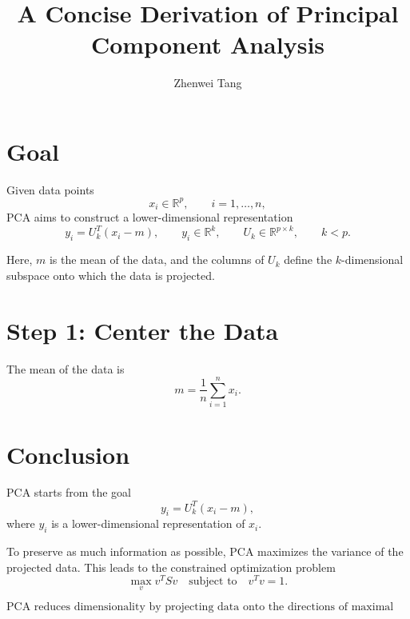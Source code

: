 \documentclass[11pt]{article}
\begin{document}
\title{A Concise Derivation of Principal Component Analysis}
\author{Zhenwei Tang}
\date{}
\maketitle

\section*{Goal}

Given data points
\[
x_i \in \mathbb{R}^p,
\qquad i=1,\dots,n,
\]
PCA aims to construct a lower-dimensional representation
\[
y_i = U_k^T(x_i-m),
\qquad
y_i \in \mathbb{R}^k,
\qquad
U_k \in \mathbb{R}^{p\times k},
\qquad
k < p.
\]

Here, \(m\) is the mean of the data, and the columns of \(U_k\) define the \(k\)-dimensional subspace onto which the data is projected.


\section*{Step 1: Center the Data}

The mean of the data is
\[
m = \frac{1}{n}\sum_{i=1}^n x_i.
\]


\section*{Conclusion}

PCA starts from the goal
\[
y_i = U_k^T(x_i-m),
\]
where \(y_i\) is a lower-dimensional representation of \(x_i\).

To preserve as much information as possible, PCA maximizes the variance of the projected data. This leads to the constrained optimization problem
\[
\max_v v^TSv
\quad
\text{subject to}
\quad
v^Tv=1.
\]


\[
\boxed{
\text{PCA reduces dimensionality by projecting data onto the directions of maximal variance.}
}
\]
\end{document}
